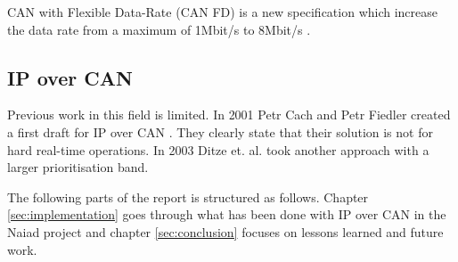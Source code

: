 CAN with Flexible Data-Rate (CAN FD) is a new specification which increase the
data rate from a maximum of 1Mbit/s to 8Mbit/s \cite{standard:can_bus_fd}.

\subsection{IP over CAN}
Previous work in this field is limited. In 2001 Petr Cach and Petr Fiedler
created a first draft for IP over CAN \cite{web:draft-ip_over_can}. They
clearly state that their solution is not for hard real-time operations. In
2003 Ditze et. al. \cite{web:porting_ip_can} took another approach with a larger prioritisation
band.

The following parts of the report is structured as follows. Chapter \ref{sec:implementation}
goes through what has been done with IP over CAN in the Naiad project and chapter
\ref{sec:conclusion} focuses on lessons learned and future work.
